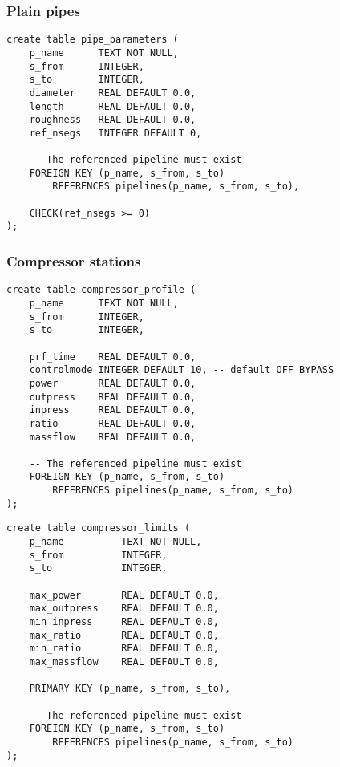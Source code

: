 \documentclass[10pt]{article}
\begin{document}
\subsubsection{Plain pipes}

\begin{verbatim}
create table pipe_parameters (
    p_name      TEXT NOT NULL,
    s_from      INTEGER,
    s_to        INTEGER,
    diameter    REAL DEFAULT 0.0,
    length      REAL DEFAULT 0.0,
    roughness   REAL DEFAULT 0.0,
    ref_nsegs   INTEGER DEFAULT 0,

    -- The referenced pipeline must exist
    FOREIGN KEY (p_name, s_from, s_to)
        REFERENCES pipelines(p_name, s_from, s_to),

    CHECK(ref_nsegs >= 0)
);
\end{verbatim}

\subsubsection{Compressor stations}
\begin{verbatim}
create table compressor_profile (
    p_name      TEXT NOT NULL,
    s_from      INTEGER,
    s_to        INTEGER,

    prf_time    REAL DEFAULT 0.0,
    controlmode INTEGER DEFAULT 10, -- default OFF BYPASS
    power       REAL DEFAULT 0.0,
    outpress    REAL DEFAULT 0.0,
    inpress     REAL DEFAULT 0.0,
    ratio       REAL DEFAULT 0.0,
    massflow    REAL DEFAULT 0.0,

    -- The referenced pipeline must exist
    FOREIGN KEY (p_name, s_from, s_to)
        REFERENCES pipelines(p_name, s_from, s_to)
);
\end{verbatim}

\begin{verbatim}
create table compressor_limits (
    p_name          TEXT NOT NULL,
    s_from          INTEGER,
    s_to            INTEGER,

    max_power       REAL DEFAULT 0.0,
    max_outpress    REAL DEFAULT 0.0,
    min_inpress     REAL DEFAULT 0.0,
    max_ratio       REAL DEFAULT 0.0,
    min_ratio       REAL DEFAULT 0.0,
    max_massflow    REAL DEFAULT 0.0,

    PRIMARY KEY (p_name, s_from, s_to),

    -- The referenced pipeline must exist
    FOREIGN KEY (p_name, s_from, s_to)
        REFERENCES pipelines(p_name, s_from, s_to)
);
\end{verbatim}
\end{document}
